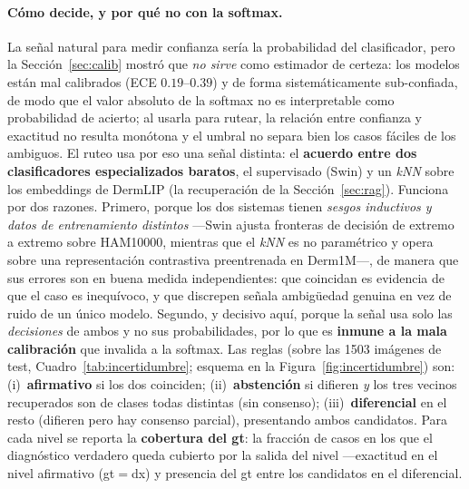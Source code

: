 \documentclass[11pt, a4paper]{article}
\begin{document}
\paragraph{Cómo decide, y por qué no con la softmax.} La señal natural para medir confianza sería la
probabilidad del clasificador, pero la Sección~\ref{sec:calib} mostró que \emph{no sirve} como estimador de
certeza: los modelos están mal calibrados (ECE $0.19$--$0.39$) y de forma sistemáticamente sub-confiada, de
modo que el valor absoluto de la softmax no es interpretable como probabilidad de acierto; al usarla para
rutear, la relación entre confianza y exactitud no resulta monótona y el umbral no separa bien los casos
fáciles de los ambiguos. El ruteo usa por eso una señal distinta: el \textbf{acuerdo entre dos
clasificadores especializados baratos}, el supervisado (Swin) y un \emph{kNN} sobre los embeddings de
DermLIP (la recuperación de la Sección~\ref{sec:rag}). Funciona por dos razones. Primero, porque los dos
sistemas tienen \emph{sesgos inductivos y datos de entrenamiento distintos} —Swin ajusta fronteras de
decisión de extremo a extremo sobre HAM10000, mientras que el \emph{kNN} es no paramétrico y opera sobre
una representación contrastiva preentrenada en Derm1M—, de manera que sus errores son en buena medida
independientes: que coincidan es evidencia de que el caso es inequívoco, y que discrepen señala ambigüedad
genuina en vez de ruido de un único modelo. Segundo, y decisivo aquí, porque la señal usa solo las
\emph{decisiones} de ambos y no sus probabilidades, por lo que es \textbf{inmune a la mala calibración}
que invalida a la softmax. Las reglas
(sobre las 1503 imágenes de test, Cuadro~\ref{tab:incertidumbre}; esquema en la
Figura~\ref{fig:incertidumbre}) son: (i)~\textbf{afirmativo} si los dos
coinciden; (ii)~\textbf{abstención} si difieren \emph{y} los tres vecinos recuperados son de clases todas
distintas (sin consenso); (iii)~\textbf{diferencial} en el resto (difieren pero hay consenso parcial),
presentando ambos candidatos. Para cada nivel se reporta la \textbf{cobertura del gt}: la fracción de
casos en los que el diagnóstico verdadero queda cubierto por la salida del nivel —exactitud en el nivel
afirmativo (gt$=$dx) y presencia del gt entre los candidatos en el diferencial.
\end{document}
